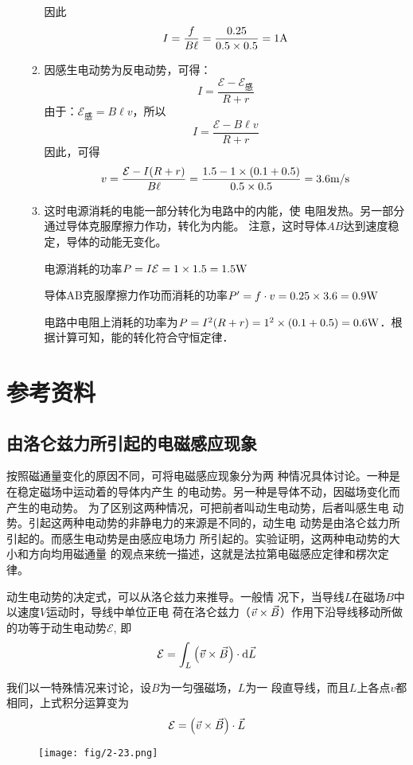 \begin{enumerate}
\begin{solution}
\begin{enumerate}
    因此
    \[I=\frac{f}{B\ell}=\frac{0.25}{0.5\times 0.5}=1{\rm A}\]

    \item 因感生电动势为反电动势，可得：
    \[I=\frac{\mathcal{E}-\mathcal{E}_{\text{感}}}{R+r}\]
由于：$\mathcal{E}_{\text{感}}=B\ell v$，所以
\[I=\frac{\mathcal{E}-B\ell v}{R+r}\]
因此，可得
\[v=\frac{\mathcal{E}-I(R+r)}{B\ell }=\frac{1.5-1\times(0.1+0.5)}{0.5\times 0.5}=3.6\text{m}/\text{s}\]
\item 这时电源消耗的电能一部分转化为电路中的内能，使
电阻发热。另一部分通过导体克服摩擦力作功，转化为内能。
注意，这时导体$AB$达到速度稳定，导体的动能无变化。

电源消耗的功率$P=I\mathcal{E}=1\times1.5=1.5{\rm W}$

导体AB克服摩擦力作功而消耗的功率$P'=f\cdot v=0.25\times3.6=0.9{\rm W}$

电路中电阻上消耗的功率为$P=I^2(R+r)=1^2\times(0.1+0.5)=0.6{\rm W}$．根据计算可知，能的转化符合守恒定律．
\end{enumerate}
\end{solution}


\end{enumerate}


\section{参考资料}
\subsection{由洛仑兹力所引起的电磁感应现象}

按照磁通量变化的原因不同，可将电磁感应现象分为两
种情况具体讨论。一种是在稳定磁场中运动着的导体内产生
的电动势。另一种是导体不动，因磁场变化而产生的电动势。
为了区别这两种情况，可把前者叫动生电动势，后者叫感生电
动势。引起这两种电动势的非静电力的来源是不同的，动生电
动势是由洛仑兹力所引起的。而感生电动势是由感应电场力
所引起的。实验证明，这两种电动势的大小和方向均用磁通量
的观点来统一描述，这就是法拉第电磁感应定律和楞次定律。

动生电动势的决定式，可以从洛仑兹力来推导。一般情
况下，当导线$L$在磁场$B$中以速度$V$运动时，导线中单位正电
荷在洛仑兹力（$\vec{v}\times \vec{B}$）作用下沿导线移动所做的功等于动生电动势$\mathcal{E}$, 即
\[\mathcal{E}=\int_L \left(\vec{v}\times \vec{B}\right)\cdot \dd \vec{L}\]

我们以一特殊情况来讨论，设$B$为一匀强磁场，$L$为一
段直导线，而且$L$上各点$v$都相同，上式积分运算变为
\[\mathcal{E}=\left(\vec{v}\times \vec{B}\right)\cdot \vec{L}\]
\begin{figure}[htp]
    \centering
\texttt{[image: fig/2-23.png]}
    \caption{}
\end{figure}

